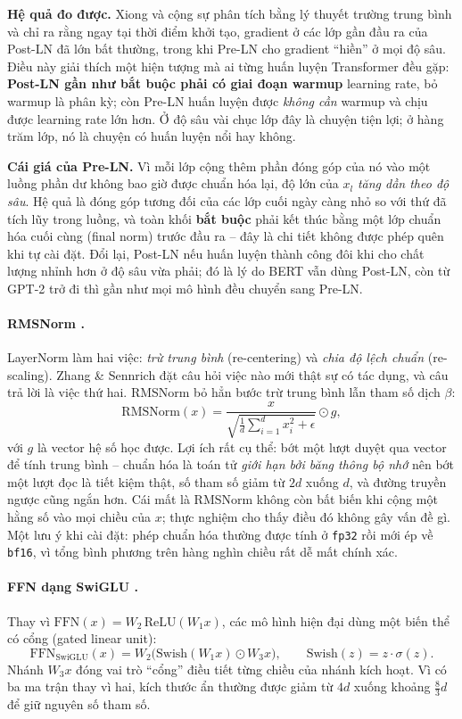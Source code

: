 \textbf{Hệ quả đo được.} Xiong và cộng sự \cite{xiong2020layernorm} phân tích bằng lý thuyết trường trung bình và chỉ ra rằng ngay tại thời điểm khởi tạo, gradient ở các lớp gần đầu ra của Post-LN đã lớn bất thường, trong khi Pre-LN cho gradient “hiền” ở mọi độ sâu. Điều này giải thích một hiện tượng mà ai từng huấn luyện Transformer đều gặp: \textbf{Post-LN gần như bắt buộc phải có giai đoạn warmup} learning rate, bỏ warmup là phân kỳ; còn Pre-LN huấn luyện được \emph{không cần} warmup và chịu được learning rate lớn hơn. Ở độ sâu vài chục lớp đây là chuyện tiện lợi; ở hàng trăm lớp, nó là chuyện có huấn luyện nổi hay không.

\textbf{Cái giá của Pre-LN.} Vì mỗi lớp cộng thêm phần đóng góp của nó vào một luồng phần dư không bao giờ được chuẩn hóa lại, độ lớn của $x_l$ \emph{tăng dần theo độ sâu}. Hệ quả là đóng góp tương đối của các lớp cuối ngày càng nhỏ so với thứ đã tích lũy trong luồng, và toàn khối \textbf{bắt buộc} phải kết thúc bằng một lớp chuẩn hóa cuối cùng (final norm) trước đầu ra -- đây là chi tiết không được phép quên khi tự cài đặt. Đổi lại, Post-LN nếu huấn luyện thành công đôi khi cho chất lượng nhỉnh hơn ở độ sâu vừa phải; đó là lý do BERT vẫn dùng Post-LN, còn từ GPT-2 trở đi thì gần như mọi mô hình đều chuyển sang Pre-LN.

\paragraph{RMSNorm \cite{zhang2019rmsnorm}.} LayerNorm làm hai việc: \emph{trừ trung bình} (re-centering) và \emph{chia độ lệch chuẩn} (re-scaling). Zhang \& Sennrich đặt câu hỏi việc nào mới thật sự có tác dụng, và câu trả lời là việc thứ hai. RMSNorm bỏ hẳn bước trừ trung bình lẫn tham số dịch $\beta$:
\[
\text{RMSNorm}(x) = \frac{x}{\sqrt{\frac{1}{d}\sum_{i=1}^{d} x_i^2 + \epsilon}} \odot g,
\]
với $g$ là vector hệ số học được. Lợi ích rất cụ thể: bớt một lượt duyệt qua vector để tính trung bình -- chuẩn hóa là toán tử \emph{giới hạn bởi băng thông bộ nhớ} nên bớt một lượt đọc là tiết kiệm thật, số tham số giảm từ $2d$ xuống $d$, và đường truyền ngược cũng ngắn hơn. Cái mất là RMSNorm không còn bất biến khi cộng một hằng số vào mọi chiều của $x$; thực nghiệm cho thấy điều đó không gây vấn đề gì. Một lưu ý khi cài đặt: phép chuẩn hóa thường được tính ở \texttt{fp32} rồi mới ép về \texttt{bf16}, vì tổng bình phương trên hàng nghìn chiều rất dễ mất chính xác.

\paragraph{FFN dạng SwiGLU \cite{shazeer2020glu}.} Thay vì $\text{FFN}(x) = W_2\,\text{ReLU}(W_1 x)$, các mô hình hiện đại dùng một biến thể có cổng (gated linear unit):
\[
\text{FFN}_{\text{SwiGLU}}(x) = W_2\Big(\text{Swish}(W_1 x) \odot W_3 x\Big), \qquad \text{Swish}(z) = z\cdot\sigma(z).
\]
Nhánh $W_3 x$ đóng vai trò “cổng” điều tiết từng chiều của nhánh kích hoạt. Vì có ba ma trận thay vì hai, kích thước ẩn thường được giảm từ $4d$ xuống khoảng $\tfrac{8}{3}d$ để giữ nguyên số tham số.

